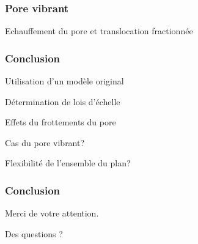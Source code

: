 \documentclass{beamer}
\begin{document}
\frame
{\frametitle{Pore vibrant}

{\centering
{}\par
}
\begin{center}
Echauffement du pore et translocation fractionnée
\end{center}

}









\frame %
{
  \frametitle{Conclusion}
 
 
 \begin{itemize}
 
 \begin{center}
 \item Utilisation d'un modèle original
 \pause
 \medskip
 \item Détermination de lois d'échelle
 \pause
 \medskip
 \item Effets du frottements du pore
 \pause
 \medskip
 \item Cas du pore vibrant?
 \pause
 \medskip
 \item Flexibilité de l'ensemble du plan?
 \end{center}
 
 \end{itemize}


}

\frame %
{
  \frametitle{Conclusion}
 
 
 
 
 \begin{center}
 {\HUGE Merci de votre attention.
 
 
 \pause
 \medskip
 Des questions ?}
 \end{center}
 
 


}
\end{document}
